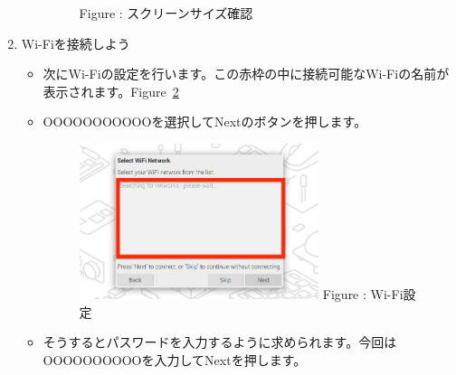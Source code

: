 \documentclass[a4paper,12pt]{jarticle}
\begin{document}
\begin{enumerate}
\begin{itemize}
\begin{figure}[h]
\begin{minipage}{5.228cm}
{                              \newline
                              Figure {\theFigure\label{seq:refFigure15}}:
                              スクリーンサイズ確認}
                          \end{minipage}
                        \end{figure}
                      \end{itemize}  
                      
  \clearpage                   
  \item     
        Wi-Fiを接続しよう
                \begin{itemize}
                  \item
                        次にWi-Fiの設定を行います。この赤枠の中に接続可能なWi-Fiの名前が表示されます。Figure~\ref{seq:refFigure16}
                  \item     
                        OOOOOOOOOOOを選択してNextのボタンを押します。
                        \begin{figure}[h]
                          \centering
                          \begin{minipage}{5.228cm}
                            {\upshape
                              \includegraphics[width=7.000cm]{sw_image06kai.png}
                              \newline
                              Figure {\theFigure\label{seq:refFigure16}}:
                              Wi-Fi設定}
                          \end{minipage}
                        \end{figure}
                \end{itemize}
                \begin{itemize}
                  \item
                      そうするとパスワードを入力するように求められます。今回はOOOOOOOOOOを入力してNextを押します。
                      \begin{figure}[h]

\end{figure}
\end{itemize}
\end{enumerate}
\end{document}
